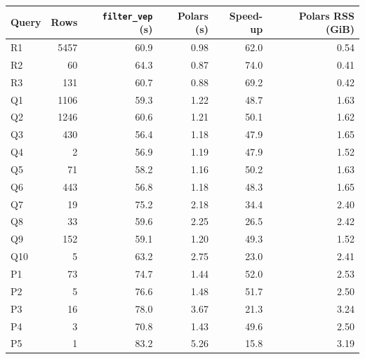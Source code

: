\begin{tabular}{lrrrrr}
\toprule
Query & Rows & \texttt{filter\_vep} (s) & Polars (s) & Speed-up & Polars RSS (GiB) \\
\midrule
R1 & 5457 & 60.9 & 0.98 & 62.0 & 0.54 \\
R2 & 60 & 64.3 & 0.87 & 74.0 & 0.41 \\
R3 & 131 & 60.7 & 0.88 & 69.2 & 0.42 \\
Q1 & 1106 & 59.3 & 1.22 & 48.7 & 1.63 \\
Q2 & 1246 & 60.6 & 1.21 & 50.1 & 1.62 \\
Q3 & 430 & 56.4 & 1.18 & 47.9 & 1.65 \\
Q4 & 2 & 56.9 & 1.19 & 47.9 & 1.52 \\
Q5 & 71 & 58.2 & 1.16 & 50.2 & 1.63 \\
Q6 & 443 & 56.8 & 1.18 & 48.3 & 1.65 \\
Q7 & 19 & 75.2 & 2.18 & 34.4 & 2.40 \\
Q8 & 33 & 59.6 & 2.25 & 26.5 & 2.42 \\
Q9 & 152 & 59.1 & 1.20 & 49.3 & 1.52 \\
Q10 & 5 & 63.2 & 2.75 & 23.0 & 2.41 \\
P1 & 73 & 74.7 & 1.44 & 52.0 & 2.53 \\
P2 & 5 & 76.6 & 1.48 & 51.7 & 2.50 \\
P3 & 16 & 78.0 & 3.67 & 21.3 & 3.24 \\
P4 & 3 & 70.8 & 1.43 & 49.6 & 2.50 \\
P5 & 1 & 83.2 & 5.26 & 15.8 & 3.19 \\
\bottomrule
\end{tabular}
